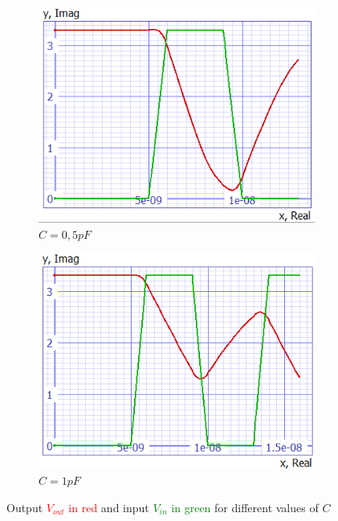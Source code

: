 \documentclass[../main.tex]{subfiles}
\begin{document}
{\begin{figure}[H]
			\begin{subfigure}{0.3\textwidth}
				\centering
				\includegraphics[width=\textwidth]{plots/Q6_05pf.png}
				\caption{$C = 0,5pF$}
				\label{fig:subfig4}
			\end{subfigure}
			\begin{subfigure}{0.3\textwidth}
				\centering
				\includegraphics[width=\textwidth]{plots/Q6_1pf.png}
				\caption{$C = 1pF$}
				\label{fig:subfig5}
			\end{subfigure}
			
			\caption{Output \textcolor{red}{$V_{out}$ in red} and input \textcolor{green}{$V_{in}$ in green} for different values of $C$}
			\label{fig:mainfig}
		\end{figure}
		
}
\end{document}
